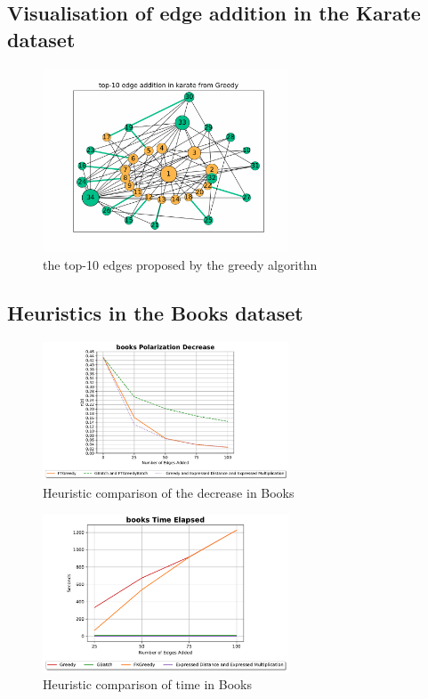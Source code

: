 \begin{table}[H]
\subsection{Visualisation of edge addition in  the Karate dataset}

\begin{figure}[!htbp]
	\centering
	\includegraphics[width=0.65\textwidth]{Figures/top-10_karate_greedy}
	\caption{the top-10 edges proposed by the greedy algorithn}
	\label{fig:top-10-karate}
\end{figure}


\clearpage

\subsection{Heuristics in the Books dataset}

\begin{figure}[!htbp]
	\centering
	\includegraphics[width=0.65\textwidth]{Figures/books Polarization Decrease}
	\caption{Heuristic comparison of the decrease in Books}
	\label{fig:books_pol}
\end{figure}


\begin{figure}[!htbp]
	\centering
	\includegraphics[width=0.65\textwidth]{Figures/books Time Elapsed}
	\caption{Heuristic comparison of time in Books}
	\label{fig:books_time}
\end{figure}


\end{table}
